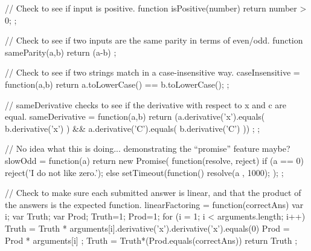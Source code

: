 \begin{javascript}
// Check to see if input is positive.
  function isPositive(number) {
    return number > 0;
  };




// Check to see if two inputs are the same parity in terms of even/odd.
  function sameParity(a,b) {
    return (a-b)%
  };




// Check to see if two strings match in a case-insensitive way.
  caseInsensitive = function(a,b) {
    return a.toLowerCase() == b.toLowerCase();
  };
  



// sameDerivative checks to see if the derivative with respect to x and c are equal.
  sameDerivative = function(a,b) {
    return (a.derivative('x').equals( b.derivative('x') ) && a.derivative('C').equals( b.derivative('C') )) ;
  };




// No idea what this is doing... demonstrating the ``promise'' feature maybe?
slowOdd = function(a) {
    return new Promise( function(resolve, reject) {
        if (a == 0)
            reject('I do not like zero.');
        else
            setTimeout(function(){
            resolve(a %
            }, 1000);      
        });
    };


// Check to make sure each submitted answer is linear, and that the product of the answers is the expected function.
linearFactoring = function(correctAns) {
    var i;
    var Truth;
    var Prod;
    Truth=1;
    Prod=1;
        for (i = 1; i < arguments.length; i++) {
            Truth = Truth * arguments[i].derivative('x').derivative('x').equals(0)
            Prod = Prod * arguments[i]
        };
        Truth = Truth*(Prod.equals(correctAns))
        return Truth
    };




\end{javascript}